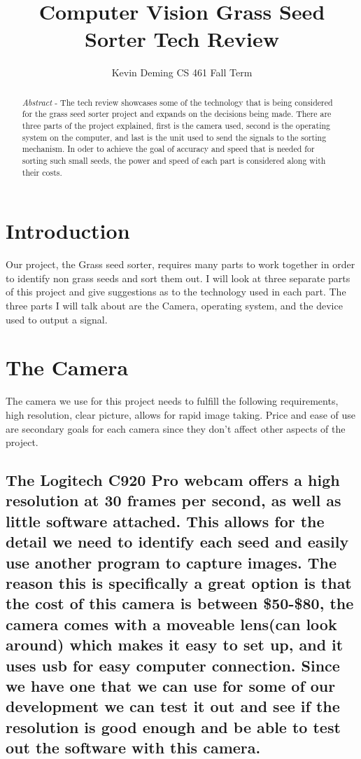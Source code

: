 \documentclass[10pt, letterpaper, twoside, draftclsnofoot, onecolumn. notitlepage]{article}
\title{Computer Vision Grass Seed Sorter Tech Review}
\author{Kevin Deming
CS 461 Fall Term}
\begin{document}
	\begin{titlepage}
		\maketitle
		\begin{abstract}
			\textit{Abstract} - The tech review showcases some of the technology that is being considered for the grass seed sorter project and expands on the decisions being made. There are three parts of the project explained, first is the camera used, second is the operating system on the computer, and last is the unit used to send the signals to the sorting mechanism. In oder to achieve the goal of accuracy and speed that is needed for sorting such small seeds, the power and speed of each part is considered along with their costs.
		\end{abstract}
	\end{titlepage}
\section{Introduction}
\quad Our project, the Grass seed sorter, requires many parts to work together in order to identify non grass seeds and sort them out. I will look at three separate parts of this project and give suggestions as to the technology used in each part. The three parts I will talk about are the Camera, operating system, and the device used to output a signal.


\section{The Camera}
\quad
The camera we use for this project needs to fulfill the following requirements, high resolution, clear picture, allows for rapid image taking. Price and ease of use are secondary goals for each camera since they don't affect other aspects of the project.

\subsection {The Logitech C920 Pro webcam offers a high resolution at 30 frames per second, as well as little software attached. This allows for the detail we need to identify each seed and easily use another program to capture images. The reason this is specifically a great option is that the cost of this camera is between \$50-\$80, the camera comes with a moveable lens(can look around) which makes it easy to set up, and it uses usb for easy computer connection. Since we have one that we can use for some of our development we can test it out and see if the resolution is good enough and be able to test out the software with this camera.}
\end{document}
